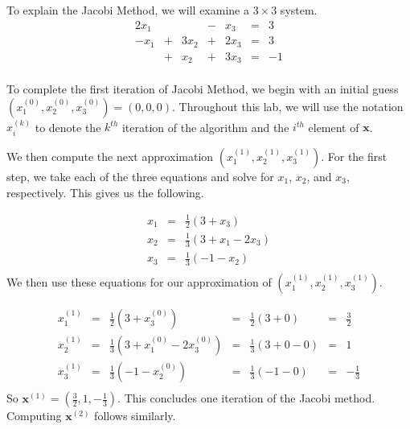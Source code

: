 To explain the Jacobi Method, we will examine a $ 3 \times 3 $ system.
$$
\begin{matrix}
2x_1 &   &      & - & x_3  & = & 3 \\
-x_1 & + & 3x_2 & + & 2x_3 & = & 3 \\
     & + & x_2  & + & 3x_3 & = & -1 \\
\end{matrix}
$$

To complete the first iteration of Jacobi Method, we begin with an initial guess
$(x^{(0)}_1, x^{(0)}_2, x^{(0)}_3) = (0,0,0)$. Throughout this lab, we will use
 the notation $x^{(k)}_i$ to denote the $k^{th}$ iteration of the algorithm and
 the $i^{th}$ element of $\mathbf{x}$.

We then compute the next approximation $(x^{(1)}_1, x^{(1)}_2, x^{(1)}_3)$.
For the first step, we take each of the three equations and solve for $x_1$,
$x_2$, and $x_3$, respectively. This gives us the following.

$$
\begin{matrix}
x_1 & = & \frac{1}{2} ( 3 + x_3) \\
x_2 & = & \frac{1}{3} ( 3 + x_1 - 2x_3) \\
x_3 & = & \frac{1}{3} ( -1 - x_2) \\
\end{matrix}
$$
We then use these equations for our approximation of $(x^{(1)}_1, x^{(1)}_2, x^{(1)}_3)$.

$$
\begin{matrix}
x^{(1)}_1 & = & \frac{1}{2} ( 3 + x^{(0)}_3)  & = & \frac{1}{2} (3 + 0)     & = & \frac{3}{2} \\
x^{(1)}_2 & = & \frac{1}{3} ( 3 + x^{(0)}_1 - 2x^{(0)}_3) & = & \frac{1}{3} (3 + 0 - 0) & = & 1 \\
x^{(1)}_3 & = & \frac{1}{3} ( -1 - x^{(0)}_2)       & = & \frac{1}{3} (-1 - 0)    & = & -\frac{1}{3} \\
\end{matrix}
$$
So $\mathbf{x}^{(1)} = (\frac{3}{2}, 1, -\frac{1}{3})$. This concludes one iteration of
the Jacobi method. Computing $\mathbf{x}^{(2)}$ follows similarly.

